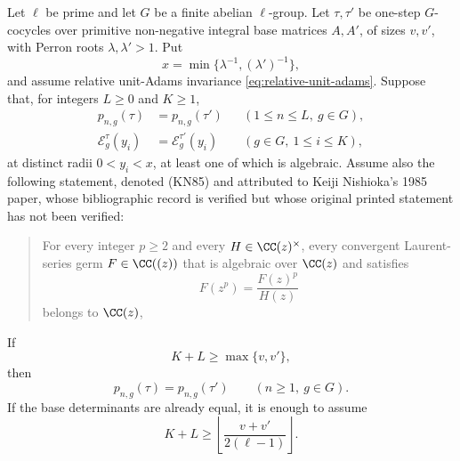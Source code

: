 \begin{theorem}
\label{thm:prime-primary-collision-jet-rigidity}
Let \(\ell\) be prime and let \(G\) be a finite abelian \(\ell\)-group.
Let \(\tau,\tau'\) be one-step \(G\)-cocycles over primitive non-negative
integral base matrices \(A,A'\), of sizes \(v,v'\), with Perron roots
\(\lambda,\lambda'>1\).  Put
\[
 x=\min\{\lambda^{-1},(\lambda')^{-1}\},
\]
and assume relative unit-Adams invariance
\eqref{eq:relative-unit-adams}.  Suppose that, for integers \(L\ge0\) and
\(K\ge1\),
\begin{align}
 p_{n,g}(\tau)&=p_{n,g}(\tau')
 &&(1\le n\le L,\ g\in G),
 \label{eq:prime-primary-initial-jet}\\
 \mathcal E_g^\tau(y_i)&=\mathcal E_g^{\tau'}(y_i)
 &&(g\in G,\ 1\le i\le K),
 \label{eq:prime-primary-profile-samples}
\end{align}
at distinct radii \(0<y_i<x\), at least one of which is algebraic.  Assume
also the following statement, denoted \textup{(KN85)} and attributed to
Keiji Nishioka's 1985 paper, whose bibliographic record is verified but whose
original printed statement has not been verified:
\begin{quote}
For every integer \(p\ge2\) and every \(H\in\CC(z)^\times\), every
convergent Laurent-series germ \(F\in\CC((z))\) that is algebraic over
\(\CC(z)\) and satisfies
\begin{equation}\label{eq:kn85-explicit-assumption}
 F(z^p)=\frac{F(z)^p}{H(z)}
\end{equation}
belongs to \(\CC(z)\),
\end{quote}
If
\begin{equation}\label{eq:prime-primary-cross-base-threshold}
 K+L\ge\max\{v,v'\},
\end{equation}
then
\[
 p_{n,g}(\tau)=p_{n,g}(\tau')
 \qquad(n\ge1,\ g\in G).
\]
If the base determinants are already equal, it is enough to assume
\begin{equation}\label{eq:prime-primary-fixed-determinant-threshold}
 K+L\ge
 \left\lfloor\frac{v+v'}{2(\ell-1)}\right\rfloor.
\end{equation}
\end{theorem}

